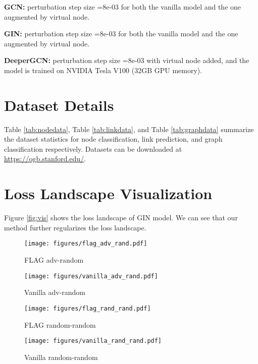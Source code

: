 \documentclass[11pt]{article}
\begin{document}
\textbf{GCN:} perturbation step size =8e-03 for both the vanilla model and the one augmented by virtual node.

\textbf{GIN:} perturbation step size =8e-03 for both the vanilla model and the one augmented by virtual node.

\textbf{DeeperGCN:} perturbation step size =8e-03 with virtual node added, and the model is trained on NVIDIA Tesla V100 (32GB GPU memory).






\section{Dataset Details}

Table \ref{tab:nodedata}, Table \ref{tab:linkdata}, and Table \ref{tab:graphdata} summarize the dataset statistics for node classification, link prediction, and graph classification respectively. Datasets can be downloaded at \url{https://ogb.stanford.edu/}.

\section{Loss Landscape Visualization}

Figure \ref{fig:vis} shows the loss landscape of GIN model. We can see that our method further regularizes the loss landscape.

\begin{figure*}[ht]\centering
    \begin{subfigure}{.24\textwidth}
        \texttt{[image: figures/flag\_adv\_rand.pdf]} 
        \caption{FLAG adv-random}
    \end{subfigure}\begin{subfigure}{.24\textwidth}
        \texttt{[image: figures/vanilla\_adv\_rand.pdf]}\caption{Vanilla adv-random}
    \end{subfigure}\begin{subfigure}{.24\textwidth}
        \texttt{[image: figures/flag\_rand\_rand.pdf]}\caption{FLAG random-random}
    \end{subfigure}
        \begin{subfigure}{.24\textwidth}
        \texttt{[image: figures/vanilla\_rand\_rand.pdf]}\caption{Vanilla random-random}
    \end{subfigure}
    \caption{Loss landscape visualization. The test is conducted on one random validation graph from  \texttt{ogbg-molhiv}. Two models are GIN trained with FLAG and a vanilla GIN. (a) and (b) projects loss onto a random direction and the other adversarial direction, while (c) and (d) use two random directions.}
    \label{fig:vis}
\end{figure*}
\end{document}

